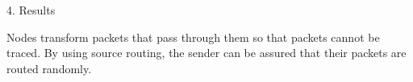 \documentclass[ %
                    author={Liam O'Shea},
                supervisor={Dr. Sion Hanunna},
                     title={ZeroToHero},
                  subtitle={},
                    degree={Bsc},
                      year={2014} ]{poster}
\begin{document}
\begin{frame}{}
\begin{columns}[t]
\begin{column}{0.422\linewidth}
\begin{block}{\normalsize 4. Results}
\begin{figure}[h]
    \end{figure}
    Nodes transform packets that pass through them so that packets cannot be traced. By using source routing, the sender can be assured that their packets are routed randomly.
    \end{block}
    \end{column}
\end{columns}

\vfill

\end{frame}

\end{document}
